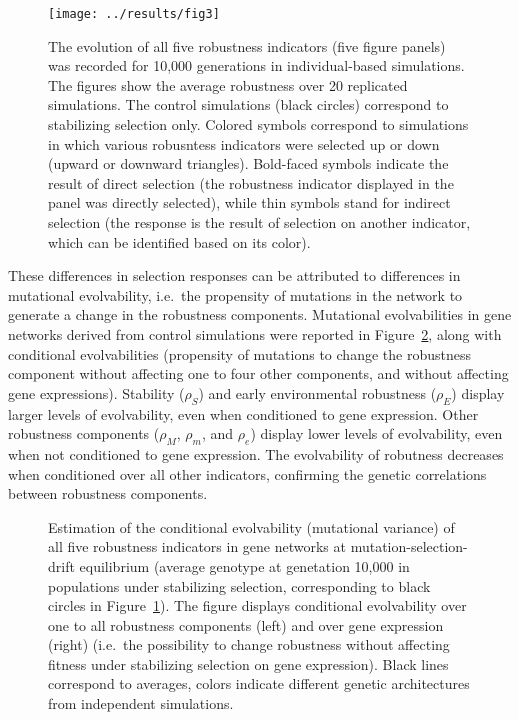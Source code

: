 \documentclass[10pt,a4paper]{article}
\newcommand{\stability}{{\rho_S}}
\newcommand{\earlyenv}{{\rho_E}}
\newcommand{\lateenv}{{\rho_e}}
\newcommand{\earlymut}{{\rho_M}}
\newcommand{\latemut}{{\rho_m}}
\begin{document}
\begin{figure}[t]
\begin{adjustwidth}{-1in}{0in}
\begin{flushright}
\texttt{[image: ../results/fig3]}
\caption{\color{Gray} \label{fig:evol} The evolution of all five robustness indicators (five figure panels) was recorded for 10,000 generations in individual-based simulations. The figures show the average robustness over 20 replicated simulations. The control simulations (black circles) correspond to stabilizing selection only. Colored symbols correspond to simulations in which various robusntess indicators were selected up or down (upward or downward triangles). Bold-faced symbols indicate the result of direct selection (the robustness indicator displayed in the panel was directly selected), while thin symbols stand for indirect selection (the response is the result of selection on another indicator, which can be identified based on its color). }
\end{flushright}\end{adjustwidth}
\end{figure}

These differences in selection responses can be attributed to differences in mutational evolvability, i.e.\ the propensity of mutations in the network to generate a change in the robustness components. Mutational evolvabilities in gene networks derived from control simulations were reported in Figure~\ref{fig:evolvability}, along with conditional evolvabilities (propensity of mutations to change the robustness component without affecting one to four other components, and without affecting gene expressions). Stability ($\stability$) and early environmental robustness ($\earlyenv$) display larger levels of evolvability, even when conditioned to gene expression. Other robustness components ($\earlymut$, $\latemut$, and $\lateenv$) display lower levels of evolvability, even when not conditioned to gene expression. The evolvability of robutness decreases when conditioned over all other indicators, confirming the genetic correlations between robustness components. 

\begin{figure}[t]
\begin{center}
\caption{\color{Gray} \label{fig:evolvability} Estimation of the conditional evolvability (mutational variance) of all five robustness indicators in gene networks at mutation-selection-drift equilibrium (average genotype at genetation 10,000 in populations under stabilizing selection, corresponding to black circles in Figure~\ref{fig:evol}). The figure displays conditional evolvability over one to all robustness components (left) and over gene expression (right) (i.e.\ the possibility to change robustness without affecting fitness under stabilizing selection on gene expression). Black lines correspond to averages, colors indicate different genetic architectures from independent simulations.  }
\end{center}
\end{figure}
\end{document}
